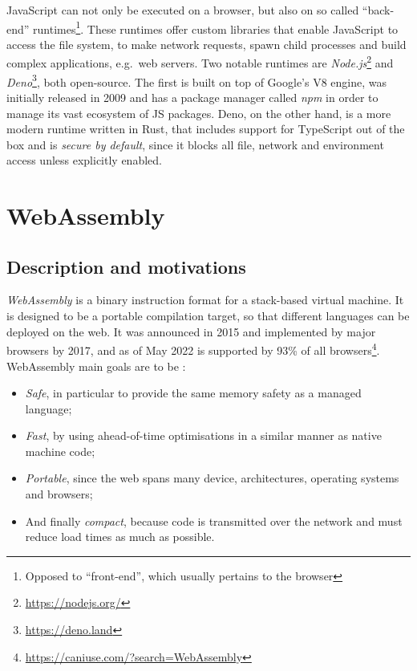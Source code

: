 JavaScript can not only be executed on a browser, but also on so called ``back-end''
runtimes\footnote{Opposed to ``front-end'', which usually pertains to the browser}.
These runtimes offer custom libraries that enable JavaScript to access the file system, to make network requests,
spawn child processes and build complex applications, e.g.\ web servers.
Two notable runtimes are \textit{Node.js}\footnote{\url{https://nodejs.org/}} and \textit{Deno}\footnote{\url{https://deno.land}},
both open-source.
The first is built on top of Google's V8 engine, was initially released in 2009 and has a package manager called \textit{npm}
in order to manage its vast ecosystem of JS packages.
Deno, on the other hand, is a more modern runtime written in Rust, that includes support for TypeScript out of the box
and is \textit{secure by default}, since it blocks all file, network and environment access unless explicitly enabled.

\section{WebAssembly}

\subsection{Description and motivations}

\textit{WebAssembly} \cite{wasm-website} is a binary instruction format for a stack-based virtual machine.
It is designed to be a portable compilation target, so that different languages can be deployed on the web.
It was announced in 2015 and implemented by major browsers by 2017, and as of May 2022 is supported
by 93\% of all browsers\footnote{\url{https://caniuse.com/?search=WebAssembly}}.
WebAssembly main goals are to be \cite{bringing-the-web-up-to-speed-2017}:
\begin{itemize}
  \item \textit{Safe}, in particular to provide the same memory safety as a managed language;
  \item \textit{Fast}, by using ahead-of-time optimisations in a similar manner as native machine code;
  \item \textit{Portable}, since the web spans many device, architectures, operating systems and browsers;
  \item And finally \textit{compact}, because code is transmitted over the network and must reduce load times as much as possible.
\end{itemize}

